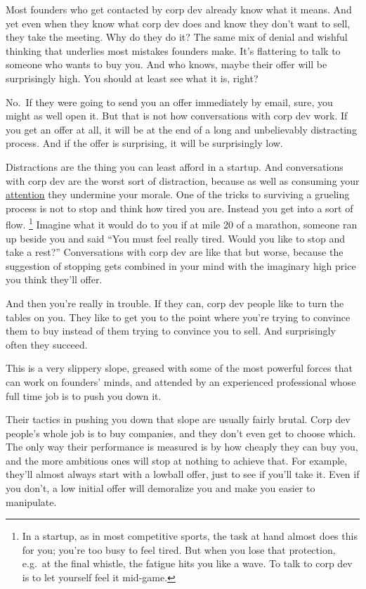 Most founders who get contacted by corp dev already know what it means.
And yet even when they know what corp dev does and know they don't want
to sell, they take the meeting. Why do they do it? The same mix of
denial and wishful thinking that underlies most mistakes founders make.
It's flattering to talk to someone who wants to buy you. And who knows,
maybe their offer will be surprisingly high. You should at least see
what it is, right?

No.~If they were going to send you an offer immediately by email, sure,
you might as well open it. But that is not how conversations with corp
dev work. If you get an offer at all, it will be at the end of a long
and unbelievably distracting process. And if the offer is surprising, it
will be surprisingly low.

Distractions are the thing you can least afford in a startup. And
conversations with corp dev are the worst sort of distraction, because
as well as consuming your \href{top.html}{attention} they undermine your
morale. One of the tricks to surviving a grueling process is not to stop
and think how tired you are. Instead you get into a sort of flow.
\footnote{In a startup, as in most competitive sports, the task at hand
almost does this for you; you're too busy to feel tired. But when you
lose that protection, e.g.~at the final whistle, the fatigue hits you
like a wave. To talk to corp dev is to let yourself feel it mid-game.} Imagine what it would do to you if at mile 20 of
a marathon, someone ran up beside you and said ``You must feel really
tired. Would you like to stop and take a rest?'' Conversations with corp
dev are like that but worse, because the suggestion of stopping gets
combined in your mind with the imaginary high price you think they'll
offer.

And then you're really in trouble. If they can, corp dev people like to
turn the tables on you. They like to get you to the point where you're
trying to convince them to buy instead of them trying to convince you to
sell. And surprisingly often they succeed.

This is a very slippery slope, greased with some of the most powerful
forces that can work on founders' minds, and attended by an experienced
professional whose full time job is to push you down it.

Their tactics in pushing you down that slope are usually fairly brutal.
Corp dev people's whole job is to buy companies, and they don't even get
to choose which. The only way their performance is measured is by how
cheaply they can buy you, and the more ambitious ones will stop at
nothing to achieve that. For example, they'll almost always start with a
lowball offer, just to see if you'll take it. Even if you don't, a low
initial offer will demoralize you and make you easier to manipulate.

